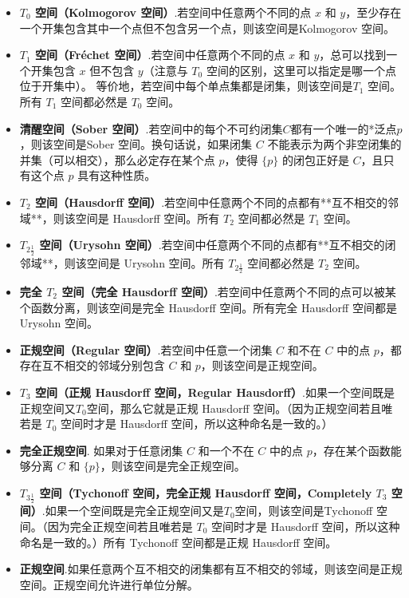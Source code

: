 \begin{itemize}
\item \textbf{$T_0$ 空间（Kolmogorov 空间）}.若空间中任意两个不同的点 $x$ 和 $y$，至少存在一个开集包含其中一个点但不包含另一个点，则该空间是Kolmogorov 空间。
\item \textbf{$T_1$ 空间（Fréchet 空间）}.若空间中任意两个不同的点 $x$ 和 $y$，总可以找到一个开集包含 $x$ 但不包含 $y$（注意与 $T_0$ 空间的区别，这里可以指定是哪一个点位于开集中）。
  等价地，若空间中每个单点集都是闭集，则该空间是$T_1$ 空间。
  所有 $T_1$ 空间都必然是 $T_0$ 空间。
\item \textbf{清醒空间（Sober 空间）}.若空间中的每个不可约闭集$C$都有一个唯一的*泛点$p$，则该空间是Sober 空间。换句话说，如果闭集 $C$ 不能表示为两个非空闭集的并集（可以相交），那么必定存在某个点 $p$，使得 $\{p\}$ 的闭包正好是 $C$，且只有这个点 $p$ 具有这种性质。
\item \textbf{ $T_2$ 空间（Hausdorff 空间）}.若空间中任意两个不同的点都有**互不相交的邻域**，则该空间是 Hausdorff 空间。所有 $T_2$ 空间都必然是 $T_1$ 空间。
\item \textbf{$T_{2\frac{1}{2}}$ 空间（Urysohn 空间）}.若空间中任意两个不同的点都有**互不相交的闭邻域**，则该空间是 Urysohn 空间。所有 $T_{2\frac{1}{2}}$ 空间都必然是 $T_2$ 空间。
\item \textbf{完全 $T_2$ 空间（完全 Hausdorff 空间）}.若空间中任意两个不同的点可以被某个函数分离，则该空间是完全 Hausdorff 空间。所有完全 Hausdorff 空间都是 Urysohn 空间。
\item \textbf{正规空间（Regular 空间）}.若空间中任意一个闭集 $C$ 和不在 $C$ 中的点 $p$，都存在互不相交的邻域分别包含 $C$ 和 $p$，则该空间是正规空间。
\item \textbf{$T_3$ 空间（正规 Hausdorff 空间，Regular Hausdorff）}.如果一个空间既是正规空间又$T_0$空间，那么它就是正规 Hausdorff 空间。（因为正规空间若且唯若是 $T_0$ 空间时才是 Hausdorff 空间，所以这种命名是一致的。）
\item \textbf{完全正规空间}.
如果对于任意闭集 $C$ 和一个不在 $C$ 中的点 $p$，存在某个函数能够分离 $C$ 和 $\{p\}$，则该空间是完全正规空间。
\item \textbf{$T_{3\frac{1}{2}}$ 空间（Tychonoff 空间，完全正规 Hausdorff 空间，Completely $T_3$ 空间）}.如果一个空间既是完全正规空间又是$T_0$空间，则该空间是Tychonoff 空间。（因为完全正规空间若且唯若是 $T_0$ 空间时才是 Hausdorff 空间，所以这种命名是一致的。）所有 Tychonoff 空间都是正规 Hausdorff 空间。
\item \textbf{正规空间}.如果任意两个互不相交的闭集都有互不相交的邻域，则该空间是正规空间。正规空间允许进行单位分解。

\end{itemize}

